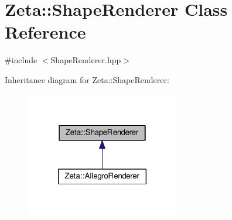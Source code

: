 \hypertarget{classZeta_1_1ShapeRenderer}{\section{Zeta\+:\+:Shape\+Renderer Class Reference}
\label{classZeta_1_1ShapeRenderer}
}


{\ttfamily \#include $<$Shape\+Renderer.\+hpp$>$}



Inheritance diagram for Zeta\+:\+:Shape\+Renderer\+:\nopagebreak
\begin{figure}[H]
\begin{center}
\leavevmode
\includegraphics[width=190pt]{classZeta_1_1ShapeRenderer__inherit__graph}
\end{center}
\end{figure}
